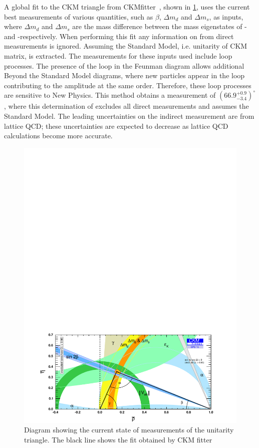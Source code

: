 A global fit to the CKM triangle from CKMfitter~\cite{CKMFitter}, shown in \fig\ref{globalfit}, uses the current best measurements of various quantities, such as $\beta$, $\Delta m_d$ and $\Delta m_s$, as inputs, where $\Delta m_d$ and $\Delta m_s$ are the mass difference between the mass eigenstates of \Bz-\Bzb and \Bs-\Bsb respectively. When performing this fit any information on \Pgamma from direct measurements is ignored. Assuming the Standard Model, i.e. unitarity of CKM matrix, \Pgamma is extracted. The measurements for these inputs used include loop processes. The presence of the loop in the Feunman diagram allows additional Beyond the Standard Model diagrams, where new particles appear in the loop contributing to the amplitude at the same order. Therefore, these loop processes are sensitive to New Physics. This method obtains a \Pgamma measurement of $(66.9^{+0.9}_{-3.4})^{\circ}$, where this determination of \Pgamma excludes all direct measurements and assumes the Standard Model. The leading uncertainties on the indirect measurement are from lattice QCD; these uncertainties are expected to decrease as lattice QCD calculations become more accurate. 
\begin{figure}[!ht]
\centering
\includegraphics[trim = 0mm 0mm 0mm 180mm,clip,width=0.9\linewidth]{figures/theory/rhoeta_small_global.pdf}
\caption{Diagram showing the current state of measurements of the unitarity triangle. The black line shows the fit obtained by CKM fitter}
\label{globalfit}
\end{figure}

